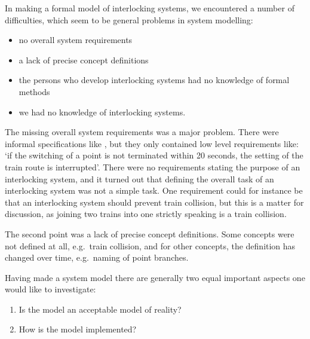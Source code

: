 \documentclass[11pt]{article}
\begin{document}
In making a
formal model of interlocking systems,
we encountered a number of
difficulties, which seem to be general problems in
system modelling:

\begin{itemize}
\item no overall system requirements

\item a lack of precise concept definitions

\item the persons who develop
  interlocking systems had no knowledge of formal methods

\item we had no knowledge of interlocking systems.
\end{itemize}

The missing overall system requirements was a major problem.
There were informal specifications like
\cite{kravspec}, but they only contained low
level requirements like: `if the switching of a
point is not terminated within 20 seconds, the setting of the train route is
interrupted'.  There were no requirements stating the
purpose
of an interlocking system, and it turned out that
defining the overall task of an interlocking system was not a simple task.
One requirement could for instance be that an interlocking system
should prevent train
collision, but this is a matter for discussion, as joining
two trains into one strictly speaking is a train collision.

The second point was a lack of precise concept definitions.
Some concepts were not defined at all, e.g.\ train collision, and for
other concepts, the definition has changed over time, e.g.\ naming of
point branches.

Having made a system model there are generally two equal important aspects one
would like to investigate:

\begin{enumerate}
\item Is the model an acceptable model of  reality?

\item How is the model implemented?
\end{enumerate}
\end{document}
